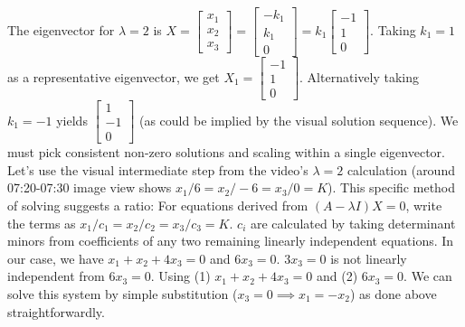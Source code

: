 \documentclass{article}
\begin{document}
The eigenvector for $\lambda = 2$ is $X = \begin{bmatrix} x_1 \\ x_2 \\ x_3 \end{bmatrix} = \begin{bmatrix} -k_1 \\ k_1 \\ 0 \end{bmatrix} = k_1 \begin{bmatrix} -1 \\ 1 \\ 0 \end{bmatrix}$.
Taking $k_1=1$ as a representative eigenvector, we get $X_1 = \begin{bmatrix} -1 \\ 1 \\ 0 \end{bmatrix}$. Alternatively taking $k_1=-1$ yields $\begin{bmatrix} 1 \\ -1 \\ 0 \end{bmatrix}$ (as could be implied by the visual solution sequence). We must pick consistent non-zero solutions and scaling within a single eigenvector. Let's use the visual intermediate step from the video's $\lambda=2$ calculation (around 07:20-07:30 image view shows $x_1/6=x_2/-6=x_3/0=K$). This specific method of solving suggests a ratio:
For equations derived from $(A-\lambda I)X=0$, write the terms as $x_1/c_1 = x_2/c_2 = x_3/c_3 = K$. $c_i$ are calculated by taking determinant minors from coefficients of any two remaining linearly independent equations. In our case, we have $x_1+x_2+4x_3=0$ and $6x_3=0$. $3x_3=0$ is not linearly independent from $6x_3=0$.
Using (1) $x_1+x_2+4x_3=0$ and (2) $6x_3=0$. We can solve this system by simple substitution ($x_3=0 \implies x_1=-x_2$) as done above straightforwardly.
\end{document}
